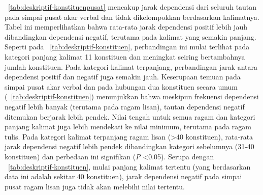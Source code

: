 \documentclass[10pt, a4paper, conference, compsocconf]{IEEEtran}
\begin{document}
\tab~\ref{tab:deskriptif-konstituenpusat} mencakup jarak dependensi dari seluruh tautan pada simpai pusat akar verbal dan tidak dikelompokkan berdasarkan kalimatnya. Tabel ini memperlihatkan bahwa rata-rata jarak dependensi positif lebih jauh dibandingkan dependensi negatif, terutama pada kalimat yang semakin panjang. Seperti pada \tab~\ref{tab:deskriptif-konstituen}, perbandingan ini mulai terlihat pada kategori panjang kalimat 11 konstituen dan meningkat seiring bertambahnya jumlah konstituen. Pada kategori kalimat terpanjang, perbandingan jarak antara dependensi positif dan negatif juga semakin jauh. Keserupaan temuan pada simpai pusat akar verbal dan pada hubungan dua konstituen secara umum (\tab~\ref{tab:deskriptif-konstituen}) menunjukkan bahwa meskipun frekuensi dependensi negatif lebih banyak (terutama pada ragam lisan), tautan dependensi negatif ditemukan berjarak lebih pendek. Nilai tengah untuk semua ragam dan kategori panjang kalimat juga lebih mendekati ke nilai minimum, terutama pada ragam tulis. Pada kategori kalimat terpanjang ragam lisan (\textgreater 40 konstituen), rata-rata jarak dependensi negatif lebih pendek dibandingkan kategori sebelumnya (31-40 konstituen) dan perbedaan ini signifikan (\textit{P} \textless 0.05). Serupa dengan \tab~\ref{tab:deskriptif-konstituen}, mulai panjang kalimat tertentu (yang berdasarkan data ini adalah sekitar 40 konstituen), jarak dependensi negatif pada simpai pusat ragam lisan juga tidak akan melebihi nilai tertentu. 
\end{document}
